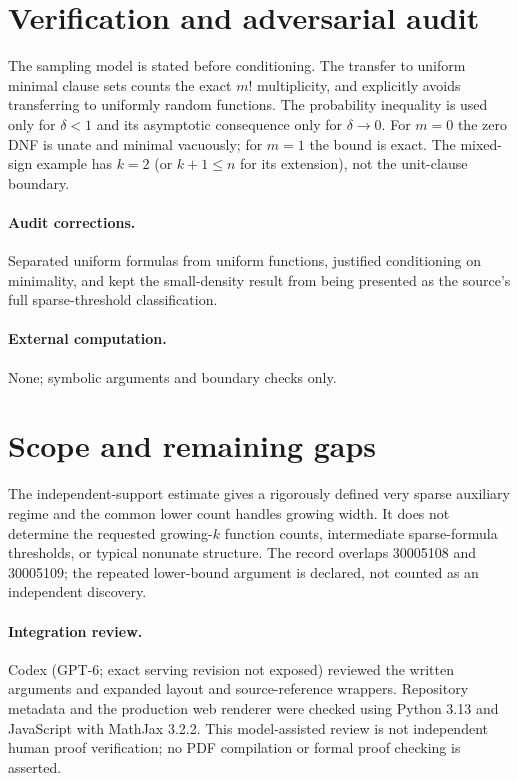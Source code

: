 \documentclass[11pt]{article}
\begin{document}
\section{Verification and adversarial audit}

The sampling model is stated before conditioning. The transfer to uniform
minimal clause sets counts the exact $m!$ multiplicity, and explicitly avoids
transferring to uniformly random functions. The probability inequality is used
only for $\delta<1$ and its asymptotic consequence only for $\delta\to0$.
For $m=0$ the zero DNF is unate and minimal vacuously; for $m=1$ the bound is
exact. The mixed-sign example has $k=2$ (or $k+1\leq n$ for its extension),
not the unit-clause boundary.

\paragraph{Audit corrections.} Separated uniform formulas from uniform functions, justified conditioning
on minimality, and kept the small-density result from being presented as the
source's full sparse-threshold classification.
\paragraph{External computation.} None; symbolic arguments and boundary checks only.
\section{Scope and remaining gaps}

The independent-support estimate gives a rigorously defined very sparse
auxiliary regime and the common lower count handles growing width. It does
not determine the requested growing-$k$ function counts, intermediate
sparse-formula thresholds, or typical nonunate structure. The record overlaps
30005108 and 30005109; the repeated lower-bound argument is declared, not
counted as an independent discovery.

\paragraph{Integration review.} Codex (GPT-6; exact serving revision not exposed) reviewed the written arguments and expanded layout and source-reference wrappers. Repository metadata and the production web renderer were checked using Python 3.13 and JavaScript with MathJax 3.2.2. This model-assisted review is not independent human proof verification; no PDF compilation or formal proof checking is asserted.
\end{document}
